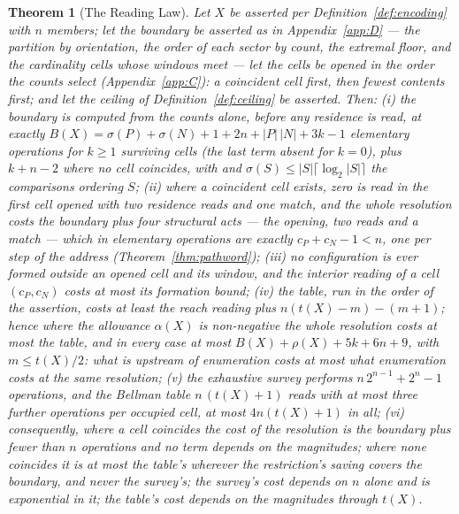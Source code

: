 \documentclass[pdflatex,sn-mathphys-num]{sn-jnl}
\theoremstyle{thmstyleone}%
\newtheorem{theorem}{Theorem}[section]
\theoremstyle{thmstyletwo}%
\theoremstyle{thmstylethree}%
\newtheorem{theorem}{Theorem}[section]
\begin{document}
\begin{theorem}[The Reading Law]\label{thm:reading}
Let $X$ be asserted per Definition~\ref{def:encoding} with $n$ members; let the boundary be asserted as in Appendix~\ref{app:D} --- the partition by orientation, the order of each sector by count, the extremal floor, and the cardinality cells whose windows meet --- let the cells be opened in the order the counts select (Appendix~\ref{app:C}): a coincident cell first, then fewest contents first; and let the ceiling of Definition~\ref{def:ceiling} be asserted. Then: (i) the boundary is computed from the counts alone, before any residence is read, at exactly $B(X)=\sigma(P)+\sigma(N)+1+2n+|P|\,|N|+3k-1$ elementary operations for $k\ge1$ surviving cells (the last term absent for $k=0$), plus $k+n-2$ where no cell coincides, with and $\sigma(S)\le|S|\lceil\log_2|S|\rceil$ the comparisons ordering $S$; (ii) where a coincident cell exists, zero is read in the first cell opened with two residence reads and one match, and the whole resolution costs the boundary plus four structural acts --- the opening, two reads and a match --- which in elementary operations are exactly $c_P+c_N-1<n$, one per step of the address (Theorem~\ref{thm:pathword}); (iii) no configuration is ever formed outside an opened cell and its window, and the interior reading of a cell $(c_P,c_N)$ costs at most its formation bound; (iv) the table, run in the order of the assertion, costs at least the reach reading plus $n(t(X)-m)-(m+1)$; hence where the allowance $\alpha(X)$ is non-negative the whole resolution costs at most the table, and in every case at most $B(X)+\rho(X)+5k+6n+9$, with $m\le t(X)/2$: what is upstream of enumeration costs at most what enumeration costs at the same resolution; (v) the exhaustive survey performs $n\,2^{n-1}+2^n-1$ operations, and the Bellman table $n\,(t(X)+1)$ reads with at most three further operations per occupied cell, at most $4n(t(X)+1)$ in all; (vi) consequently, where a cell coincides the cost of the resolution is the boundary plus fewer than $n$ operations and no term depends on the magnitudes; where none coincides it is at most the table's wherever the restriction's saving covers the boundary, and never the survey's; the survey's cost depends on $n$ alone and is exponential in it; the table's cost depends on the magnitudes through $t(X)$.
\end{theorem}
\end{document}
